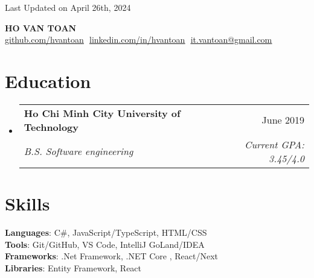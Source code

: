 \documentclass[letterpaper,11pt]{article}
\makeatletter
\newcommand{\resumeSubheading}[4]{
  \vspace{-2pt}\item
    \begin{tabular*}{0.97\textwidth}[t]{l@{\extracolsep{\fill}}r}
      \textbf{#1} & #2 \\
      \textit{\small#3} & \textit{\small #4} \\
    \end{tabular*}\vspace{-7pt}
}
\newcommand{\resumeSubHeadingListStart}{\begin{itemize}[leftmargin=0.15in, label={}]}
\newcommand{\resumeSubHeadingListEnd}{\end{itemize}}
\makeatother
\begin{document}
\begin{flushright}
  \color{gray}
  \item
  Last Updated on April 26th, 2024
\end{flushright}

\vspace{-5pt}

\begin{center}
  \textbf{\Huge\scshape{HO VAN TOAN}}\vspace{8pt} \\
  \small
  \href{https://github.com/mattyDoe}{\underline{github.com/hvantoan}} $  $
  \href{https://linkedin.com/in/mattydoe}{\underline{linkedin.com/in/hvantoan}} $  $
  \href{mailto:it.vantoan@gmail.com}
  {\underline{it.vantoan@gmail.com}}
\end{center}

\section{Education}
\resumeSubHeadingListStart
\resumeSubheading
{Ho Chi Minh City University of Technology}{June 2019}
{B.S. Software engineering}{Current GPA: 3.45/4.0}
\resumeSubHeadingListEnd

\section{Skills}
\begin{itemize}[leftmargin=0.15in, label={}]
  \small{\item{
        \textbf{Languages}{: C\#, JavaScript/TypeScript, HTML/CSS} \\
        \textbf{Tools}{: Git/GitHub, VS Code, IntelliJ GoLand/IDEA}\\
        \textbf{Frameworks}{: .Net Framework, .NET Core , React/Next} \\
        \textbf{Libraries}{: Entity Framework, React  }\\
        }}
\end{itemize}

\end{document}
